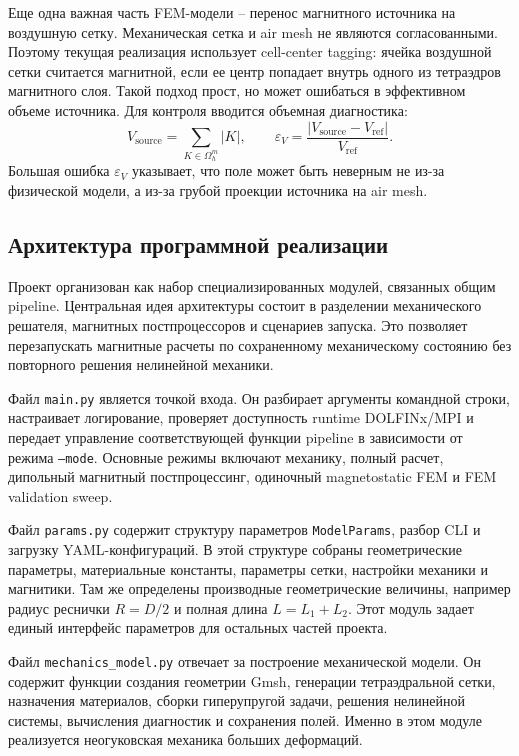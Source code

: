 \documentclass[12pt,a4paper]{article}
\begin{document}
Еще одна важная часть FEM-модели -- перенос магнитного источника на воздушную
сетку. Механическая сетка и air mesh не являются согласованными. Поэтому
текущая реализация использует cell-center tagging: ячейка воздушной сетки
считается магнитной, если ее центр попадает внутрь одного из тетраэдров
магнитного слоя. Такой подход прост, но может ошибаться в эффективном объеме
источника. Для контроля вводится объемная диагностика:
\[
    V_{\mathrm{source}} =
    \sum_{K\in\Omega_h^m}|K|,
    \qquad
    \varepsilon_V =
    \frac{|V_{\mathrm{source}}-V_{\mathrm{ref}}|}{V_{\mathrm{ref}}}.
\]
Большая ошибка \(\varepsilon_V\) указывает, что поле может быть неверным не из-за
физической модели, а из-за грубой проекции источника на air mesh.

\subsection{Архитектура программной реализации}

Проект организован как набор специализированных модулей, связанных общим
pipeline. Центральная идея архитектуры состоит в разделении механического
решателя, магнитных постпроцессоров и сценариев запуска. Это позволяет
перезапускать магнитные расчеты по сохраненному механическому состоянию без
повторного решения нелинейной механики.

Файл \texttt{main.py} является точкой входа. Он разбирает аргументы командной
строки, настраивает логирование, проверяет доступность runtime DOLFINx/MPI и
передает управление соответствующей функции pipeline в зависимости от режима
\texttt{--mode}. Основные режимы включают механику, полный расчет, дипольный
магнитный постпроцессинг, одиночный magnetostatic FEM и FEM validation sweep.

Файл \texttt{params.py} содержит структуру параметров \texttt{ModelParams},
разбор CLI и загрузку YAML-конфигураций. В этой структуре собраны геометрические
параметры, материальные константы, параметры сетки, настройки механики и
магнитики. Там же определены производные геометрические величины, например
радиус реснички \(R=D/2\) и полная длина \(L=L_1+L_2\). Этот модуль задает
единый интерфейс параметров для остальных частей проекта.

Файл \texttt{mechanics\_model.py} отвечает за построение механической модели.
Он содержит функции создания геометрии Gmsh, генерации тетраэдральной сетки,
назначения материалов, сборки гиперупругой задачи, решения нелинейной системы,
вычисления диагностик и сохранения полей. Именно в этом модуле реализуется
неогуковская механика больших деформаций.
\end{document}
